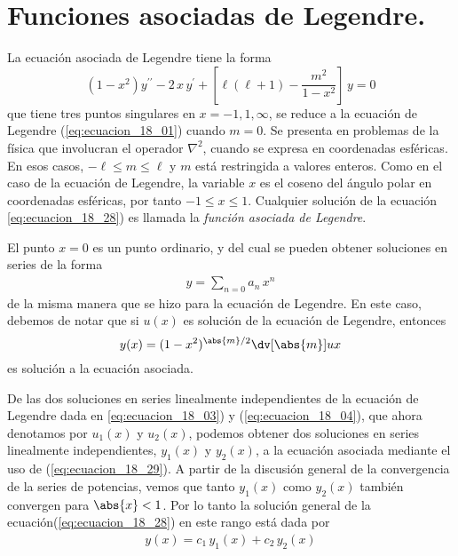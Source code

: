\section{Funciones asociadas de Legendre.}
La ecuación asociada de Legendre tiene la forma
\begin{equation}
(1 - x^{2}) y^{\prime \prime} - 2 \, x \, y^{\prime} + \left[ \ell (\ell + 1) - \dfrac{m^{2}}{1 - x^{2}} \right] \, y = 0
\label{eq:ecuacion_18_28}
\end{equation}
que tiene tres puntos singulares en $x = -1, 1, \infty$, se reduce a la ecuación de Legendre (\ref{eq:ecuacion_18_01}) cuando $m = 0$. Se presenta en problemas de la física que involucran el operador $\nabla^{2}$, cuando se expresa en coordenadas esféricas. En esos casos, $- \ell \leq m \leq \ell$ y $m$ está restringida a valores enteros. Como en el caso de la ecuación de Legendre, la variable $x$ es el coseno del ángulo polar en coordenadas esféricas, por tanto $-1 \leq x \leq 1$. Cualquier solución de la ecuación \ref{eq:ecuacion_18_28}) es llamada la \emph{función asociada de Legendre}.
\par
El punto $x = 0$ es un punto ordinario, y del cual se pueden obtener soluciones en series de la forma
\begin{align*}
y = \sum_{n=0} a_{n} \, x^{n}
\end{align*}
de la misma manera que se hizo para la ecuación de Legendre. En este caso, debemos de notar que si $u(x)$ es solución de la ecuación de Legendre, entonces
\begin{equation}
y(x) = (1 -x^{2})^{\abs{m}/ 2} \dv[\abs{m}]{u}{x}
\label{eq:ecuacion_18_29}
\end{equation}
es solución a la ecuación asociada.
\par
De las dos soluciones en series linealmente independientes de la ecuación de Legendre dada en \ref{eq:ecuacion_18_03}) y (\ref{eq:ecuacion_18_04}), que ahora denotamos por $u_{1} (x)$ y $u_{2}(x)$, podemos obtener dos soluciones en series linealmente independientes, $y_{1} (x)$ y $y_{2} (x)$, a la ecuación asociada mediante el uso de (\ref{eq:ecuacion_18_29}). A partir de la discusión general de la convergencia de la series de potencias, vemos que tanto $y_{1} (x)$ como $y_{2} (x)$ también convergen para $\abs{x} < 1$. Por lo tanto la solución general de la ecuación(\ref{eq:ecuacion_18_28}) en este rango está dada por
\begin{align*}
y(x) = c_{1} \, y_{1} (x) + c_{2} \, y_{2} (x)
\end{align*}

